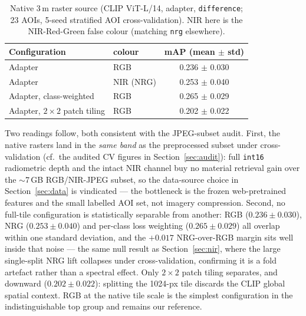 \documentclass{article}
\begin{document}
\begin{table}[H]
    \centering
    \caption{Native 3\,m raster source (CLIP ViT-L/14, adapter, \texttt{difference};
    23 AOIs, 5-seed stratified AOI cross-validation). NIR here is the
    NIR-Red-Green false colour (matching \texttt{nrg} elsewhere).}
    \label{tab:nativeraster}
    \begin{tabular}{llc}
        \toprule
        \textbf{Configuration} & \textbf{colour} & \textbf{mAP (mean $\pm$ std)} \\
        \midrule
        Adapter                & RGB  & 0.236 $\pm$ 0.030 \\
        Adapter                & NIR (NRG)  & 0.253 $\pm$ 0.040 \\
        Adapter, class-weighted & RGB & 0.265 $\pm$ 0.029 \\
        Adapter, $2\times2$ patch tiling & RGB & 0.202 $\pm$ 0.022 \\
        \bottomrule
    \end{tabular}
\end{table}

Two readings follow, both consistent with the JPEG-subset audit. First, the native
rasters land in the \emph{same band} as the preprocessed subset under
cross-validation (cf.\ the audited CV figures in Section~\ref{sec:audit}): full
\texttt{int16} radiometric depth and the intact NIR channel buy no material
retrieval gain over the $\sim$7\,GB RGB/NIR-JPEG subset, so the data-source choice
in Section~\ref{sec:data} is vindicated --- the bottleneck is the frozen
web-pretrained features and the small labelled AOI set, not imagery compression.
Second, no full-tile configuration is statistically separable from another: RGB
($0.236\pm0.030$), NRG ($0.253\pm0.040$) and per-class loss weighting
($0.265\pm0.029$) all overlap within one standard deviation, and the $+0.017$
NRG-over-RGB margin sits well inside that noise --- the same null result as
Section~\ref{sec:nir}, where the large single-split NRG lift collapses under
cross-validation, confirming it is a fold artefact rather than a spectral effect.
Only $2\times2$ patch tiling separates, and downward ($0.202\pm0.022$): splitting
the 1024-px tile discards the CLIP global spatial context. RGB at the native tile
scale is the simplest configuration in the indistinguishable top group and remains
our reference.
\end{document}
